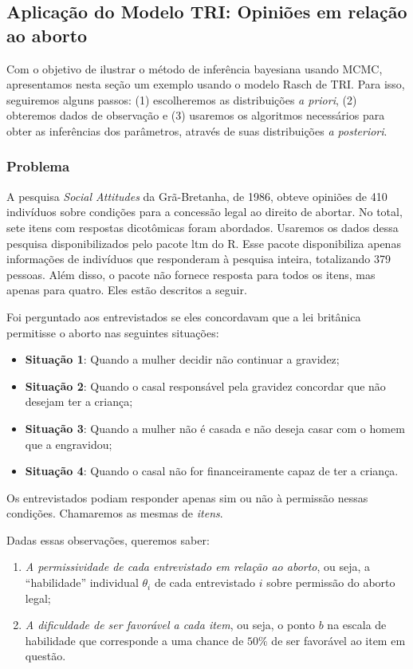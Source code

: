 \documentclass[
	12pt,				%
	openright,			%
	twoside,			%
	a4paper,			%
	english,			%
	brazil				%
	]{abntex2}
\begin{document}
 \subsection{Aplicação do Modelo TRI: Opiniões em relação ao aborto}\label{exemplomcmc}
 Com o objetivo de ilustrar o método de inferência bayesiana usando MCMC, apresentamos nesta seção um exemplo usando o modelo Rasch de TRI. Para isso, seguiremos alguns passos: (1) escolheremos as distribuições \emph{a priori}, (2) obteremos dados de observação e (3) usaremos os algoritmos necessários para obter as inferências dos parâmetros, através de suas distribuições \emph{a posteriori}.
 
 \subsubsection*{Problema}
 A pesquisa \emph{Social Attitudes} da Grã-Bretanha, de 1986, obteve opiniões de 410 indivíduos sobre condições para a concessão legal ao direito de abortar. No total, sete itens com respostas dicotômicas foram abordados. Usaremos os dados dessa pesquisa disponibilizados pelo pacote ltm do R. Esse pacote disponibiliza apenas informações de indivíduos que responderam à pesquisa inteira, totalizando 379 pessoas. Além disso, o pacote não fornece resposta para todos os itens, mas apenas para quatro. Eles estão descritos a seguir.
 
 Foi perguntado aos entrevistados se eles concordavam que a lei britânica permitisse o aborto nas seguintes situações:
 \begin{itemize}
  \item \textbf{Situação 1}: Quando a mulher decidir não continuar a gravidez;
  \item \textbf{Situação 2}: Quando o casal responsável pela gravidez concordar que não desejam ter a criança;
  \item \textbf{Situação 3}: Quando a mulher não é casada e não deseja casar com o homem que a engravidou;
  \item \textbf{Situação 4}: Quando o casal não for financeiramente capaz de ter a criança.
 \end{itemize}
 Os entrevistados podiam responder apenas sim ou não à permissão nessas condições. Chamaremos as mesmas de \emph{itens}.

 Dadas essas observações, queremos saber:
 \begin{enumerate}
  \item \emph{A permissividade de cada entrevistado em relação ao aborto}, ou seja, a ``habilidade'' individual $\theta_{i}$ de cada entrevistado $i$ sobre permissão do aborto legal;
  \item \emph{A dificuldade de ser favorável a cada item}, ou seja, o ponto $b$ na escala de habilidade que corresponde a uma chance de $50\%$ de ser favorável ao item em questão.
 \end{enumerate}
 
\end{document}

